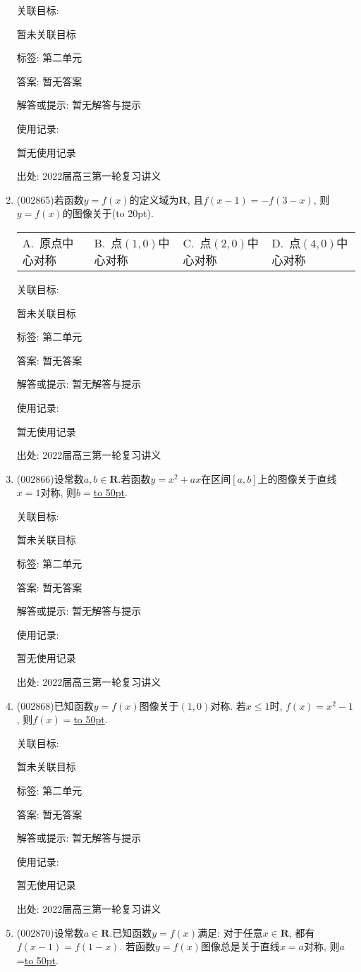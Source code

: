 \documentclass[10pt,a4paper]{article}
\newcommand{\blank}[1]{\underline{\hbox to #1pt{}}}
\newcommand{\bracket}[1]{(\hbox to #1pt{})}
\newcommand{\fourch}[4]{\par\begin{tabular}{p{.23\textwidth}p{.23\textwidth}p{.23\textwidth}p{.23\textwidth}}
A.~#1 &B.~#2& C.~#3& D.~#4
\end{tabular}}
\begin{document}
\begin{enumerate}[1.]
关联目标:

暂未关联目标



标签: 第二单元

答案: 暂无答案

解答或提示: 暂无解答与提示

使用记录:

暂无使用记录


出处: 2022届高三第一轮复习讲义
\item { (002865)}若函数$y=f(x)$的定义域为$\mathbf{R}$, 且$f(x-1)=-f(3-x)$, 则$y=f(x)$的图像关于\bracket{20}.
\fourch{原点中心对称}{点$(1,0)$中心对称}{点$(2,0)$中心对称}{点$(4,0)$中心对称}


关联目标:

暂未关联目标



标签: 第二单元

答案: 暂无答案

解答或提示: 暂无解答与提示

使用记录:

暂无使用记录


出处: 2022届高三第一轮复习讲义
\item { (002866)}设常数$a,b\in \mathbf{R}$.若函数$y=x^2+ax$在区间$[a,b]$上的图像关于直线$x=1$对称, 则$b=$\blank{50}.


关联目标:

暂未关联目标



标签: 第二单元

答案: 暂无答案

解答或提示: 暂无解答与提示

使用记录:

暂无使用记录


出处: 2022届高三第一轮复习讲义
\item { (002868)}已知函数$y=f(x)$图像关于$(1,0)$对称. 若$x\le 1$时, $f(x)=x^2-1$, 则$f(x)=$\blank{50}.


关联目标:

暂未关联目标



标签: 第二单元

答案: 暂无答案

解答或提示: 暂无解答与提示

使用记录:

暂无使用记录


出处: 2022届高三第一轮复习讲义
\item { (002870)}设常数$a\in \mathbf{R}$.已知函数$y=f(x)$满足: 对于任意$x\in \mathbf{R}$, 都有$f(x-1)=f(1-x)$. 若函数$y=f(x)$图像总是关于直线$x=a$对称, 则$a$=\blank{50}.



\end{enumerate}
\end{document}

